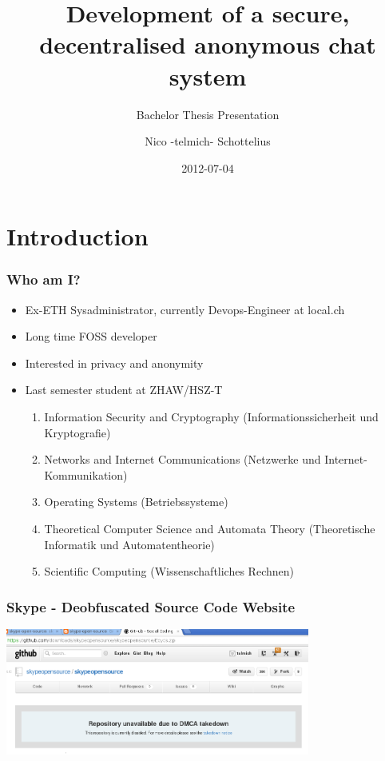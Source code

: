 \documentclass{beamer}
\title{Development of a secure, decentralised anonymous chat system}
\subtitle{Bachelor Thesis Presentation}
\author{Nico -telmich- Schottelius}
\date{2012-07-04}
\begin{document}
\frame{\titlepage}


\section{Introduction}
\frame
{
  \frametitle{Who am I?}
  \begin{itemize}
  \item Ex-ETH Sysadministrator, currently Devops-Engineer at local.ch
  \item Long time FOSS developer 
  \item Interested in privacy and anonymity
  \item Last semester student at ZHAW/HSZ-T
  \begin{enumerate}
      \item  Information Security and Cryptography (Informationssicherheit und Kryptografie)
      \item  Networks and Internet Communications (Netzwerke und Internet-Kommunikation)
      \item  Operating Systems (Betriebssysteme)
      \item  Theoretical Computer Science and Automata Theory (Theoretische Informatik und Automatentheorie)
      \item  Scientific Computing (Wissenschaftliches Rechnen)
  \end{enumerate}
  \end{itemize}
}

\frame
{
    \frametitle{Skype - Deobfuscated Source Code Website}

    \begin{center}
        \includegraphics[width=10cm]{dmca-skype.png}
    \end{center}
}
\end{document}
